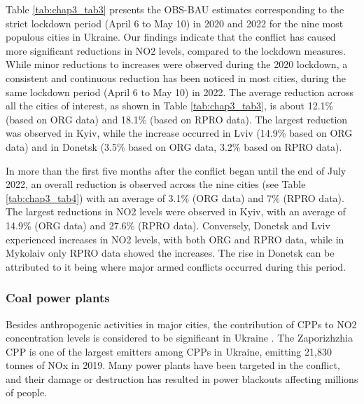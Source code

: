 Table \ref{tab:chap3_tab3} presents the OBS-BAU estimates corresponding to the strict lockdown period (April 6 to May 10) in 2020 and 2022 for the nine most populous cities in Ukraine. Our findings indicate that the conflict has caused more significant reductions in NO2 levels, compared to the lockdown measures. While minor reductions to increases were observed during the 2020 lockdown, a consistent and continuous reduction has been noticed in most cities, during the same lockdown period (April 6 to May 10) in 2022. The average reduction across all the cities of interest, as shown in Table \ref{tab:chap3_tab3}, is about 12.1\% (based on ORG data) and 18.1\% (based on RPRO data). The largest reduction was observed in Kyiv, while the increase occurred in Lviv (14.9\% based on ORG data) and in Donetsk (3.5\% based on ORG data, 3.2\% based on RPRO data).\par

In more than the first five months after the conflict began until the end of July 2022, an overall reduction is observed across the nine cities (see Table \ref{tab:chap3_tab4}) with an average of 3.1\% (ORG data) and 7\% (RPRO data). The largest reductions in NO2 levels were observed in Kyiv, with an average of 14.9\% (ORG data) and 27.6\% (RPRO data). Conversely, Donetsk and Lviv experienced increases in NO2 levels, with both ORG and RPRO data, while in Mykolaiv only RPRO data showed the increases. The rise in Donetsk can be attributed to it being where major armed conflicts occurred during this period.\par
\subsubsection*{Coal power plants}
Besides anthropogenic activities in major cities, the contribution of CPPs to NO2 concentration levels is considered to be significant in Ukraine \citep{lauri2021}. The Zaporizhzhia CPP is one of the largest emitters among CPPs in Ukraine, emitting 21,830 tonnes of NOx in 2019. Many power plants have been targeted in the conflict, and their damage or destruction has resulted in power blackouts affecting millions of people. \par

